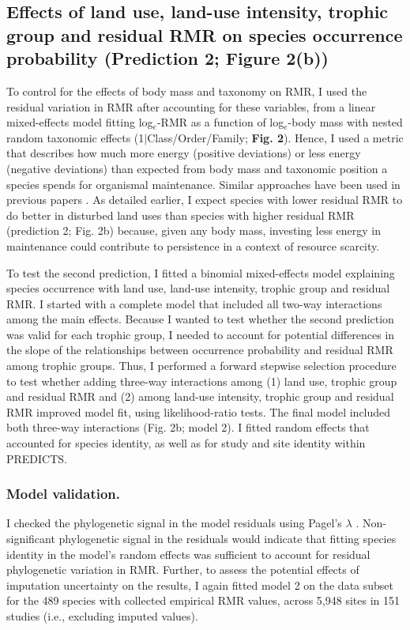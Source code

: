 \subsection{Effects of land use, land-use intensity, trophic group and residual RMR on species occurrence probability (Prediction 2; Figure 2(b))}

To control for the effects of body mass and taxonomy on RMR, I used the residual variation in RMR after accounting for these variables, from a linear mixed-effects model fitting log$_e$-RMR as a function of log$_e$-body mass with nested random taxonomic effects (1$\mid$Class/Order/Family; \textbf{Fig. 2}). Hence, I used a metric that describes how much more energy (positive deviations) or less energy (negative deviations) than expected from body mass and taxonomic position a species spends for organismal maintenance. Similar approaches have been used in previous papers \citep{Furness2008, Naya2013}. As detailed earlier, I expect species with lower residual RMR to do better in disturbed land uses than species with higher residual RMR (prediction 2; Fig. 2b) because, given any body mass, investing less energy in maintenance could contribute to persistence in a context of resource scarcity. 

To test the second prediction, I fitted a binomial mixed-effects model explaining species occurrence with land use, land-use intensity, trophic group and residual RMR. I started with a complete model that included all two-way interactions among the main effects. Because I wanted to test whether the second prediction was valid for each trophic group, I needed to account for potential differences in the slope of the relationships between occurrence probability and residual RMR among trophic groups. Thus, I performed a forward stepwise selection procedure to test whether adding three-way interactions among (1) land use, trophic group and residual RMR and (2) among land-use intensity, trophic group and residual RMR improved model fit, using likelihood-ratio tests. The final model included both three-way interactions (Fig. 2b; model 2). I fitted random effects that accounted for species identity, as well as for study and site identity within PREDICTS.  

\subsubsection*{Model validation.}
I checked the phylogenetic signal in the model residuals using Pagel’s $\lambda$ \citep{Pagel1999}. Non-significant phylogenetic signal in the residuals would indicate that fitting species identity in the model’s random effects was sufficient to account for residual phylogenetic variation in RMR. Further, to assess the potential effects of imputation uncertainty on the results, I again fitted model 2 on the data subset for the 489 species with collected empirical RMR values, across 5,948 sites in 151 studies (i.e., excluding imputed values).  


